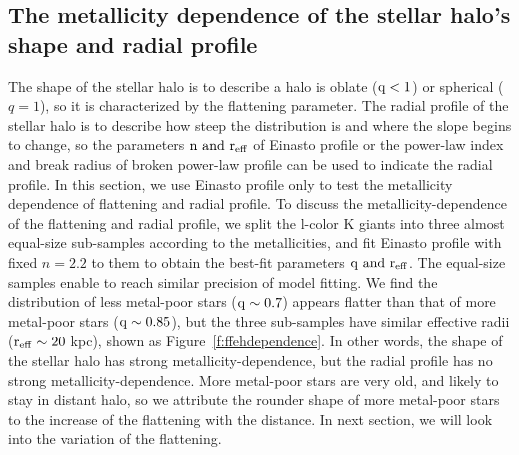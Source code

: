 \documentclass[12pt,preprint]{aastex}
\begin{document}
\subsection{The metallicity dependence of the stellar halo's shape and radial profile}
The shape of the stellar halo is to describe a halo is oblate ($\rm q<1$) or spherical ($q=1$), so it is characterized by the flattening parameter. The radial profile of the stellar halo is to describe how steep the distribution is and where the slope begins to change, so the parameters $\rm n~ and ~r_{eff}$ of Einasto profile or the power-law index and break radius of broken power-law profile can be used to indicate the radial profile. In this section, we use Einasto profile only to test the metallicity dependence of flattening and radial profile.
To discuss the metallicity-dependence of the flattening and radial profile, we split the l-color K giants into three almost equal-size sub-samples according to the metallicities, and fit Einasto profile with fixed $n=2.2$ to them to obtain the best-fit parameters $\rm q ~and ~r_{eff}$. The equal-size samples enable to reach similar precision of model fitting. We find the distribution of less metal-poor stars ($\rm q\sim0.7$) appears flatter than that of more metal-poor stars ($\rm q\sim0.85$), but the three sub-samples have similar effective radii ($\rm r_{eff}\sim20~$kpc), shown as Figure~\ref{f:ffehdependence}. In other words, the shape of the stellar halo has strong metallicity-dependence, but the radial profile has no strong metallicity-dependence.
More metal-poor stars are very old, and likely to stay in distant halo, so we attribute the rounder shape of more metal-poor stars to the increase of the flattening with the distance. In next section, we will look into the variation of the flattening.
\end{document}

